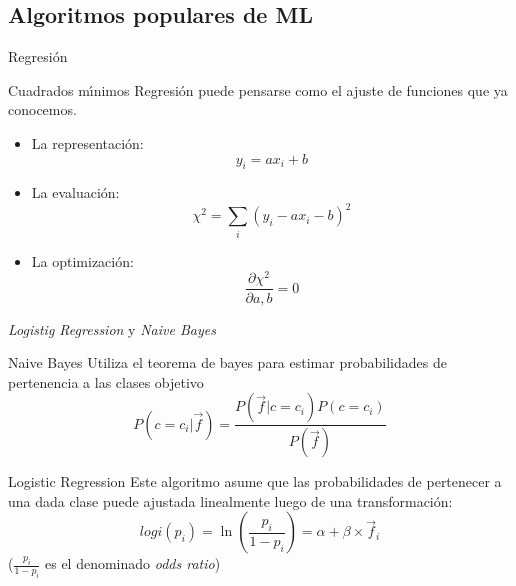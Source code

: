 \documentclass[11pt]{beamer}
\begin{document}
\subsection{Algoritmos populares de ML}
\begin{frame}{Regresi\'on}
    
    \begin{block}{Cuadrados m\'{\i}nimos}
    Regresi\'on puede pensarse como el ajuste de funciones que ya conocemos.
    \end{block}
    
    \begin{itemize}
        \item La representaci\'on: $$y_i = a x_i + b$$
        \item La evaluaci\'on: $$\chi^2 = \sum_i(y_i - a x_i -b)^2$$
        \item La optimizaci\'on: $$\frac{\partial \chi^2}{\partial a,b} = 0$$
   \end{itemize}
\end{frame}
\begin{frame}{\textit{Logistig Regression} y \textit{Naive Bayes}}
    \begin{exampleblock}{Naive Bayes}
    Utiliza el teorema de bayes para estimar probabilidades de pertenencia a las clases objetivo
    $$P(c=c_i|\vec{f}) = \frac{P(\vec{f}|c=c_i)P(c=c_i)}{P(\vec{f})}$$
    \end{exampleblock}
    
    \begin{exampleblock}{Logistic Regression}
    Este algoritmo asume que las probabilidades de pertenecer a una dada clase
    puede ajustada linealmente luego de una transformaci\'on:
    \begin{displaymath}
    logi(p_i) = \ln(\frac{p_i}{1-p_i}) = \alpha + \beta \times \vec{f}_i
    \end{displaymath}
    ($\frac{p_i}{1-p_i}$ es el denominado \textit{odds ratio})
    \end{exampleblock}
    
\end{frame}
\end{document}
